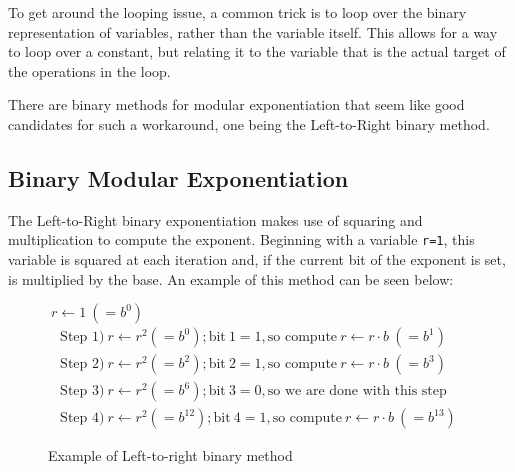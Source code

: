 To get around the looping issue, a common trick is to loop over the binary representation of variables, rather than the variable itself. This allows for a way to loop over a constant, but relating it to the variable that is the actual target of the operations in the loop.

There are binary methods for modular exponentiation that seem like good candidates for such a workaround, one being the Left-to-Right binary method\cite{LeftToRight}.







\subsection{Binary Modular Exponentiation}
\label{BinModExp}
The Left-to-Right binary exponentiation makes use of squaring and multiplication to compute the exponent. Beginning with a variable \texttt{r=1}, this variable is squared at each iteration and, if the current bit of the exponent is set, is multiplied by the base. An example of this method can be seen below:

\begin{figure}[H]
     $~ r \leftarrow 1 ~ (=b^0)$ 
    \begin{align*}
    \text{Step 1)} ~ r \leftarrow r^2 (=b^0); \text{bit} ~ 1=1, \text{so compute} ~ r \leftarrow r\cdot b ~(=b^1) ~~~~\\
    \text{Step 2)} ~ r \leftarrow r^2 (=b^2); \text{bit} ~ 2=1, \text{so compute} ~ r \leftarrow r\cdot b ~(=b^3)\ ~~~\\
    \text{Step 3)} ~ r \leftarrow r^2 (=b^6); \text{bit} ~ 3=0, \text{so we are done with this step} ~~\\
    \text{Step 4)} ~ r \leftarrow r^2 (=b^12); \text{bit} ~ 4=1, \text{so compute} ~ r \leftarrow r\cdot b ~(=b^13)\
    \end{align*}
    \caption{Example of Left-to-right binary method \cite{LeftToRightWiki}}
\end{figure}

